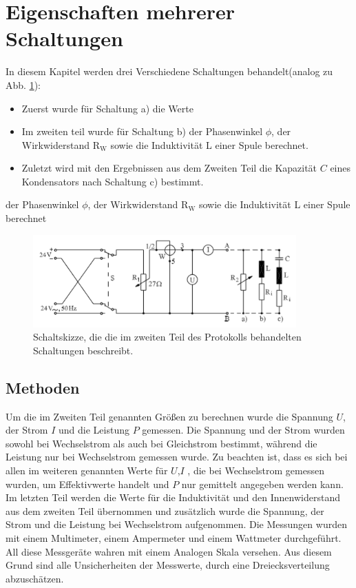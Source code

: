 \section{Eigenschaften mehrerer Schaltungen}
In diesem Kapitel werden  drei Verschiedene Schaltungen behandelt(analog zu Abb. \ref{fig:Leistungsaufnahme}):
\begin{itemize}
	\item Zuerst wurde für Schaltung a) die Werte %
	\item Im zweiten teil wurde für Schaltung b) der Phasenwinkel $\phi$, der Wirkwiderstand R$_\text{W}$ sowie die Induktivität L einer Spule	 berechnet.
	\item Zuletzt wird mit den Ergebnissen aus dem Zweiten Teil die Kapazität $C$ eines Kondensators nach Schaltung c) bestimmt.
\end{itemize}

der Phasenwinkel $\phi$, der Wirkwiderstand R$_\text{W}$ sowie die Induktivität L einer Spule berechnet
\begin{figure}[h]
	\centering
	\includegraphics[width=0.9\textwidth]{res/Schaltskizze.png}
	\caption{Schaltskizze, die die im zweiten Teil des Protokolls behandelten Schaltungen beschreibt. }
	\label{fig:Leistungsaufnahme}
\end{figure}

\subsection{Methoden}\label{kap:MethodenS}
Um die im Zweiten Teil genannten Größen zu berechnen wurde die Spannung $U$, der Strom $I$ und die Leistung $P$ gemessen. 
Die Spannung und der Strom wurden sowohl bei Wechselstrom als auch bei Gleichstrom bestimmt, während die Leistung nur bei Wechselstrom gemessen wurde. Zu beachten ist, dass es sich bei allen im weiteren genannten Werte für $U$,$I$ , die bei Wechselstrom gemessen wurden, um Effektivwerte handelt und $P$ nur gemittelt angegeben werden kann.
Im letzten Teil werden die Werte für die Induktivität und den Innenwiderstand aus dem zweiten Teil übernommen und zusätzlich wurde die Spannung, der Strom und die Leistung bei Wechselstrom aufgenommen.
Die Messungen wurden mit einem Multimeter, einem Ampermeter und einem Wattmeter durchgeführt.
All diese Messgeräte wahren mit einem Analogen Skala versehen. Aus diesem Grund sind alle Unsicherheiten der Messwerte, durch eine Dreiecksverteilung abzuschätzen. 
